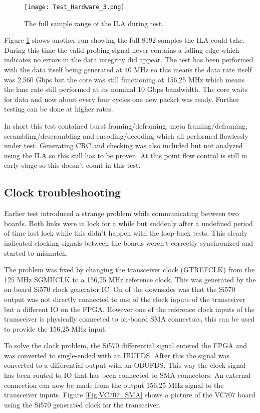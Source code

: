 	\begin{figure}[H]
		\centering
		\texttt{[image: Test\_Hardware\_3.png]}	
		\caption{The full sample range of the ILA during test.}
		\label{Fig:Test_Hardware_3}
	\end{figure}
	
	Figure \ref{Fig:Test_Hardware_3} shows another run showing the full 8192 samples the ILA could take. During this time the valid probing signal never contains a falling edge which indicates no errors in the data integrity did appear.
	The test has been performed with the data itself being generated at 40 MHz so this means the data rate itself was 2,560 Gbps but the core was still functioning at 156,25 MHz which means the lane rate still performed at its nominal 10 Gbps bandwidth. The core waits for data and now about every four cycles one new packet was ready. Further testing can be done at higher rates.
	
	In short this test contained burst framing/deframing, meta framing/deframing, scrambling/descrambling and encoding/decoding which all performed flawlessly under test.
	Generating CRC and checking was also included but not analyzed using the ILA so this still has to be proven. At this point flow control is still in early stage so this doesn't count in this test.
	
	\subsection{Clock troubleshooting}
	Earlier test introduced a strange problem while communicating between two boards. Both links were in lock for a while but suddenly after a undefined period of time lost lock while this didn't happen with the loop-back tests. This clearly indicated clocking signals between the boards weren't correctly synchronized and started to mismatch.
	
	The problem was fixed by changing the transceiver clock (GTREFCLK) from the 125 MHz SGMIICLK to a 156,25 MHz reference clock. This was generated by the on-board Si570 clock generator IC. On of the downsides was that the Si570 output was not directly connected to one of the clock inputs of the transceiver but a different IO on the FPGA. However one of the reference clock inputs of the transceiver is physically connected to on-board SMA connectors, this can be used to provide the 156,25 MHz input.
	
	To solve the clock problem, the Si570 differential signal entered the FPGA and was converted to single-ended with an IBUFDS. After this the signal was converted to a differential output with an OBUFDS. This way the clock signal has been routed to IO that has been connected to SMA connectors. An external connection can now be made from the output 156,25 MHz signal to the transceiver inputs. Figure \ref{Fig:VC707_SMA} shows a picture of the VC707 board using the Si570 generated clock for the transceiver.
	
